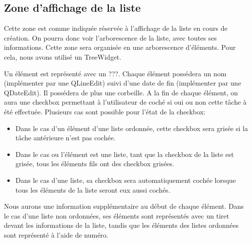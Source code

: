 \documentclass[a4paper,10pt]{article}
\begin{document}

\subsection{Zone d'affichage de la liste}
Cette zone est comme indiquée réservée à l'affichage de la liste en cours de création. On pourra donc voir l'arborescence de la liste, avec toutes ses informations.
Cette zone sera organisée en une arborescence d'éléments. Pour cela, nous avons utilisé un TreeWidget.

Un élément est représenté avec un ???. %
Chaque élément possédera un nom (implémenter par une QLineEdit) suivi d'une date de fin (implémenter par une QDateEdit). Il possédera de plus une corbeille. A la fin de chaque élément, on aura une checkbox permettant à l'utilisateur de coché si oui ou non cette tâche à été effectuée. Plusieurs cas sont possible pour l'état de la checkbox:
\begin{itemize}
\item Dans le cas d'un élément d'une liste ordonnée, cette checkbox sera grisée si la tâche antérieure n'est pas cochée.
\item Dans le cas ou l'élément est une liste, tant que la checkbox de la liste est grisée, tous les éléments fils ont des checkbox grisées.
\item Dans le cas d'une liste, sa checkbox sera automatiquement cochée lorsque tous les éléments de la liste seront eux aussi cochés.
\end{itemize}
Nous aurons une information supplémentaire au début de chaque élément. Dans le cas d'une liste non ordonnées, ses éléments sont représentés avec un tiret devant les informations de la liste, tandis que les éléments des listes ordonnées sont représenté à l'aide de numéro.

\end{document}
